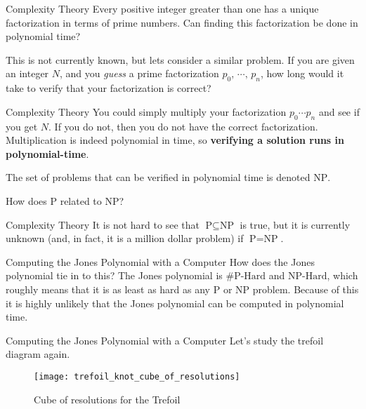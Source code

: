 \documentclass{beamer}
\begin{document}
    \begin{frame}{Complexity Theory}
        Every positive integer greater than one has a unique factorization
        in terms of prime numbers. Can finding this factorization be done in
        polynomial time?
        \par\hfill\par
        This is not currently known, but lets consider a similar problem.
        If you are given an integer $N$, and you \textit{guess} a prime
        factorization $p_{0},\,\cdots,\,p_{n}$, how long would it take to
        verify that your factorization is correct?
    \end{frame}
    \begin{frame}{Complexity Theory}
        You could simply multiply your factorization
        $p_{0}\cdots{p}_{n}$ and see if you get $N$. If you do not, then you
        do not have the correct factorization. Multiplication is indeed
        polynomial in time, so
        \textbf{verifying a solution runs in polynomial-time}.
        \par\hfill\par
        The set of problems that can be verified in polynomial time is
        denoted $\textrm{NP}$.
        \par\hfill\par
        How does $\textrm{P}$ related to $\textrm{NP}$?
    \end{frame}
    \begin{frame}{Complexity Theory}
        It is not hard to see that $\textrm{P}\subseteq\textrm{NP}$ is true,
        but it is currently unknown (and, in fact, it is a million dollar
        problem) if $\textrm{P}=\textrm{NP}$.
    \end{frame}
    \begin{frame}{Computing the Jones Polynomial with a Computer}
        How does the Jones polynomial tie in to this?
        The Jones polynomial is $\#\textrm{P-Hard}$ and $\textrm{NP-Hard}$,
        which roughly means that it is as least as hard as any
        $\textrm{P}$ or $\textrm{NP}$ problem. Because of this it is highly
        unlikely that the Jones polynomial can be computed in polynomial time.
    \end{frame}
    \begin{frame}{Computing the Jones Polynomial with a Computer}
        Let's study the trefoil diagram again.
        \begin{figure}
            \centering
            \texttt{[image: trefoil\_knot\_cube\_of\_resolutions]}
            \caption{Cube of resolutions for the Trefoil}
        \end{figure}
    \end{frame}
\end{document}
